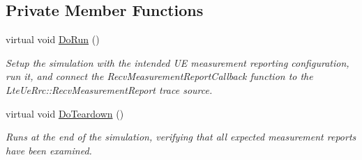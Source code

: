 \subsection*{Private Member Functions}
\begin{DoxyCompactItemize}
\item 
virtual void \hyperlink{classLteUeMeasurementsHandoverTestCase_ae81c492f54cd25f174b26310458a7e5f}{Do\+Run} ()
\begin{DoxyCompactList}\small\item\em Setup the simulation with the intended UE measurement reporting configuration, run it, and connect the {\ttfamily Recv\+Measurement\+Report\+Callback} function to the {\ttfamily Lte\+Ue\+Rrc\+::\+Recv\+Measurement\+Report} trace source. \end{DoxyCompactList}\item 
virtual void \hyperlink{classLteUeMeasurementsHandoverTestCase_a9275985873ac95e843c4129672d4c94c}{Do\+Teardown} ()
\begin{DoxyCompactList}\small\item\em Runs at the end of the simulation, verifying that all expected measurement reports have been examined. \end{DoxyCompactList}\end{DoxyCompactItemize}
